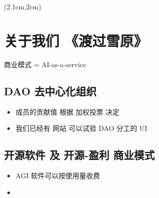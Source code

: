 \begin{preview}
\begin{minipage}{\textwidth}
\setlength{\parskip}{0.4\baselineskip}

\begin{textblock*}{20cm}(2.1cm,2cm) %
	{}
\end{textblock*}
\vspace*{0.3cm} 

\section{关于我们 《渡过雪原》}

商业模式 = AI-as-a-service

\subsection{DAO 去中心化组织}

\begin{itemize}
	\item 成员的贡献值 根据 加权投票 决定
	
	\item 我们已经有 网站 可以试验 DAO 分工的 UI

\end{itemize}

\subsection{开源软件 及 开源-盈利 商业模式}

\begin{itemize}
	\item AGI 软件可以按使用量收费 
	
	\item 
	
\end{itemize}


\end{minipage}
\end{preview}


